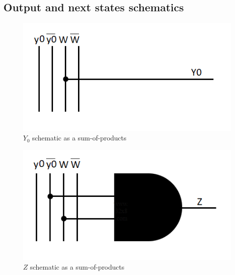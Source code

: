 \documentclass[../../e3_tp3_main.tex]{subfiles}
\begin{document}
\subsection{Output and next states schematics}
\begin{figure}[H]
	\centering
	\includegraphics{figures/Y0_schem_mealy.PNG}
	\caption{$Y_0$ schematic as a sum-of-products}
\end{figure}
\begin{figure}[H]
	\centering
	\includegraphics{figures/Z_schem_mealy.PNG}
	\caption{$Z$ schematic as a sum-of-products}
\end{figure}
\end{document}
